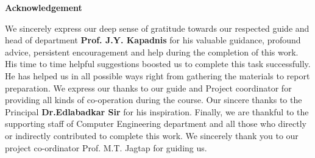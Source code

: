 \documentclass[a4paper,12pt]{report}
\begin{document}
\newpage
\vspace{2cm}
\begin{center}
\LARGE\bf{Acknowledgement}
\end{center}
\vspace{1in}

We sincerely express our deep sense of gratitude towards our respected guide and head of department\textbf{ Prof. J.Y. Kapadnis} for his valuable guidance, profound advice, persistent encouragement and help during the completion of this work. His time to time helpful suggestions boosted us to complete this task successfully. He has helped us in all possible ways right from gathering the materials to report preparation. We express our thanks to our guide and Project coordinator for providing all kinds of co-operation during the course. Our sincere thanks to the Principal \textbf{Dr.Edlabadkar Sir} for his inspiration. Finally, we are thankful to the supporting staff of Computer Engineering department and all those who directly or indirectly contributed to complete this work. We sincerely thank you to our project co-ordinator Prof. M.T. Jagtap for guiding us.



\noindent \textbf{}

\begin{center}
\\
\\
\\ 
\\
\end{center}
\clearpage
\end{document}
